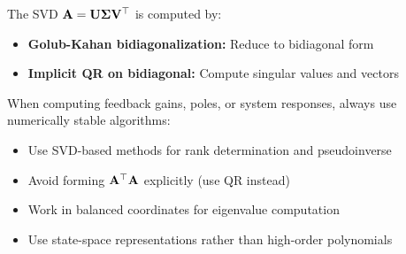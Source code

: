 The SVD $\mathbf{A} = \mathbf{U}\boldsymbol{\Sigma}\mathbf{V}^\top$ is computed by:

\begin{itemize}
    \item \textbf{Golub-Kahan bidiagonalization:} Reduce to bidiagonal form
    \item \textbf{Implicit QR on bidiagonal:} Compute singular values and vectors
\end{itemize}

\begin{keyconceptbox}[title=Numerical Stability in Control]
When computing feedback gains, poles, or system responses, always use numerically stable algorithms:
\begin{itemize}
    \item Use SVD-based methods for rank determination and pseudoinverse
    \item Avoid forming $\mathbf{A}^\top\mathbf{A}$ explicitly (use QR instead)
    \item Work in balanced coordinates for eigenvalue computation
    \item Use state-space representations rather than high-order polynomials
\end{itemize}
\end{keyconceptbox}


